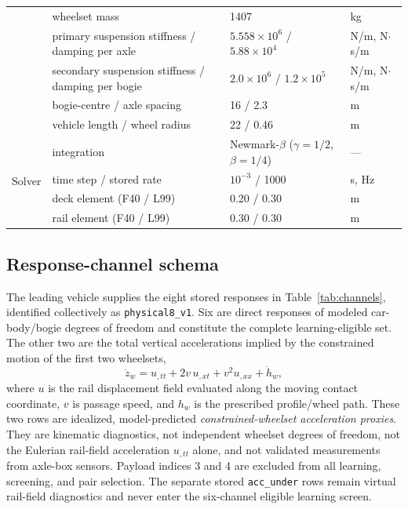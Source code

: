 \begin{table}[htbp]
{\begin{tabular}{llll}
 & wheelset mass & 1407 & kg \\
 & primary suspension stiffness / damping per axle & $5.558\times10^{6}$ / $5.88\times10^{4}$ & N/m, N$\cdot$s/m \\
 & secondary suspension stiffness / damping per bogie & $2.0\times10^{6}$ / $1.2\times10^{5}$ & N/m, N$\cdot$s/m \\
 & bogie-centre / axle spacing & 16 / 2.3 & m \\
 & vehicle length / wheel radius & 22 / 0.46 & m \\
\midrule
\multirow{4}{*}{Solver}
 & integration & Newmark-$\beta$ ($\gamma=1/2$, $\beta=1/4$) & --- \\
 & time step / stored rate & $10^{-3}$ / 1000 & s, Hz \\
 & deck element (F40 / L99) & 0.20 / 0.30 & m \\
 & rail element (F40 / L99) & 0.30 / 0.30 & m \\
\bottomrule
\end{tabular}%
}
\end{table}

\subsection{Response-channel schema}
\label{sec:response_channels}

The leading vehicle supplies the eight stored responses in
Table~\ref{tab:channels}, identified collectively as
\texttt{physical8\_v1}. Six are direct responses of modeled car-body/bogie
degrees of freedom and constitute the complete learning-eligible set. The
other two are the total vertical accelerations implied
by the constrained motion of the first two wheelsets,
\begin{equation}
  \ddot z_w = u_{,tt} + 2v\,u_{,xt} + v^2 u_{,xx} + \ddot h_w,
  \label{eq:wheelset_proxy}
\end{equation}
where $u$ is the rail displacement field evaluated along the moving contact
coordinate, $v$ is passage speed, and $h_w$ is the prescribed profile/wheel
path. These two rows are idealized, model-predicted
\emph{constrained-wheelset acceleration proxies}. They are kinematic
diagnostics, not independent wheelset degrees of freedom, not the Eulerian
rail-field acceleration $u_{,tt}$ alone, and not validated measurements from
axle-box sensors. Payload indices 3 and 4 are excluded from all learning,
screening, and pair selection.
The separate stored \texttt{acc\_under} rows remain virtual rail-field
diagnostics and never enter the six-channel eligible learning screen.

